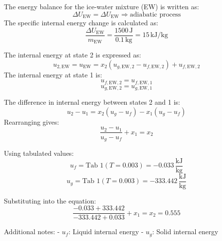 The energy balance for the ice-water mixture (EW) is written as:  
\[
\Delta U_{\text{EW}} = \Delta U_{\text{EW}} \Rightarrow \text{adiabatic process}
\]  
The specific internal energy change is calculated as:  
\[
\frac{\Delta U_{\text{EW}}}{m_{\text{EW}}} = \frac{1500 \, \text{J}}{0.1 \, \text{kg}} = 15 \, \text{kJ/kg}
\]  

The internal energy at state 2 is expressed as:  
\[
u_{2,\text{EW}} = u_{\text{EW}} = x_2 (u_{g,\text{EW},2} - u_{f,\text{EW},2}) + u_{f,\text{EW},2}
\]  
The internal energy at state 1 is:  
\[
u_{f,\text{EW},2} = u_{f,\text{EW},1}
\]  
\[
u_{g,\text{EW},2} = u_{g,\text{EW},1}
\]  

The difference in internal energy between states 2 and 1 is:  
\[
u_2 - u_1 = x_2 (u_g - u_f) - x_1 (u_g - u_f)
\]  
Rearranging gives:  
\[
\frac{u_2 - u_1}{u_g - u_f} + x_1 = x_2
\]  

Using tabulated values:  
\[
u_f = \text{Tab 1} (T = 0.003) = -0.033 \, \frac{\text{kJ}}{\text{kg}}
\]  
\[
u_g = \text{Tab 1} (T = 0.003) = -333.442 \, \frac{\text{kJ}}{\text{kg}}
\]  

Substituting into the equation:  
\[
\frac{-0.033 + 333.442}{-333.442 + 0.033} + x_1 = x_2 = 0.555
\]  

Additional notes:  
- \( u_f \): Liquid internal energy  
- \( u_g \): Solid internal energy